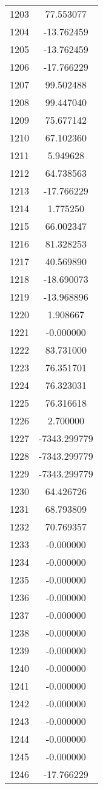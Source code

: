 \documentclass[12pt]{article}
\begin{document}
\begin{longtable}{@{}cc@{}}
1203 & 77.553077 \\
1204 & -13.762459 \\
1205 & -13.762459 \\
1206 & -17.766229 \\
1207 & 99.502488 \\
1208 & 99.447040 \\
1209 & 75.677142 \\
1210 & 67.102360 \\
1211 & 5.949628 \\
1212 & 64.738563 \\
1213 & -17.766229 \\
1214 & 1.775250 \\
1215 & 66.002347 \\
1216 & 81.328253 \\
1217 & 40.569890 \\
1218 & -18.690073 \\
1219 & -13.968896 \\
1220 & 1.908667 \\
1221 & -0.000000 \\
1222 & 83.731000 \\
1223 & 76.351701 \\
1224 & 76.323031 \\
1225 & 76.316618 \\
1226 & 2.700000 \\
1227 & -7343.299779 \\
1228 & -7343.299779 \\
1229 & -7343.299779 \\
1230 & 64.426726 \\
1231 & 68.793809 \\
1232 & 70.769357 \\
1233 & -0.000000 \\
1234 & -0.000000 \\
1235 & -0.000000 \\
1236 & -0.000000 \\
1237 & -0.000000 \\
1238 & -0.000000 \\
1239 & -0.000000 \\
1240 & -0.000000 \\
1241 & -0.000000 \\
1242 & -0.000000 \\
1243 & -0.000000 \\
1244 & -0.000000 \\
1245 & -0.000000 \\
1246 & -17.766229 \\

\end{longtable}
\end{document}
